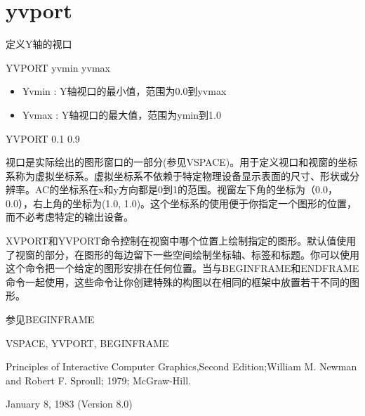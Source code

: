 \section{yvport}
\label{cmd:yvport}

定义Y轴的视口

YVPORT yvmin yvmax

\begin{itemize}
\item Yvmin : Y轴视口的最小值，范围为0.0到yvmax 
\item Yvmax : Y轴视口的最大值，范围为ymin到1.0 
\end{itemize}

YVPORT 0.1 0.9

视口是实际绘出的图形窗口的一部分(参见VSPACE)。用于定义视口和视窗的坐标系称为虚拟坐标系。虚拟坐标系不依赖于特定物理设备显示表面的尺寸、形状或分辨率。AC的坐标系在x和y方向都是0到1的范围。视窗左下角的坐标为（0.0，0.0），右上角的坐标为(1.0, 1.0)。这个坐标系的使用便于你指定一个图形的位置，而不必考虑特定的输出设备。

XVPORT和YVPORT命令控制在视窗中哪个位置上绘制指定的图形。默认值使用了视窗的部分，在图形的每边留下一些空间绘制坐标轴、标签和标题。你可以使用这个命令把一个给定的图形安排在任何位置。当与BEGINFRAME和ENDFRAME命令一起使用，这些命令让你创建特殊的构图以在相同的框架中放置若干不同的图形。

参见BEGINFRAME

VSPACE, YVPORT, BEGINFRAME

Principles of Interactive Computer Graphics,Second Edition;William M. Newman and Robert F. Sproull; 1979; McGraw-Hill.

January 8, 1983 (Version 8.0)

